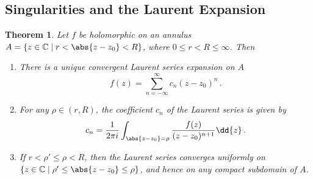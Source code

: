 \documentclass{article}
\theoremstyle{plain}\theoremheaderfont{\normalfont\itshape}\theorembodyfont{\rmfamily}\theoremseparator{.}\newtheorem*{rem}{Remark}\newtheorem*{ex}{Example}\newtheorem*{proof}{Proof}\newtheorem*{altp}{Alternative proof}
\theoremstyle{plain}\theoremheaderfont{\normalfont\bfseries}\theorembodyfont{\rmfamily}\theoremseparator{.}\newtheorem{thm}{Theorem}[section]\newtheorem{lem}[thm]{Lemma}\newtheorem{prop}[thm]{Proposition}\newtheorem*{cor}{Corollary}\newtheorem{defn}[thm]{Definition}\newtheorem{clm}[thm]{Claim}\newtheorem{clminproof}{Claim}
\theoremstyle{break}\theoremheaderfont{\normalfont\itshape}\theorembodyfont{\rmfamily}\theoremseparator{.\medskip}\newtheorem*{proofskip}{Proof}\newtheorem*{exs}{Examples}\newtheorem*{rems}{Remarks}
\theoremstyle{break}\theoremheaderfont{\normalfont\bfseries}\theorembodyfont{\rmfamily}\theoremseparator{.\medskip}\newtheorem{lemskip}[thm]{Lemma}\newtheorem{defnskip}[thm]{Definition}\newtheorem{propskip}[thm]{Proposition}\newtheorem{thmskip}[thm]{Theorem}
\numberwithin{equation}{section}
\begin{document}
	\subsection{Singularities and the Laurent Expansion}
	\begin{thm}
		Let \(f\) be holomorphic on an annulus \(A=\{z\in\mathbb{C}\mid r<\abs{z-z_0}<R\}\), where \(0\le r<R\le\infty\). Then
		\begin{enumerate}[topsep=0pt]
			\item There is a unique convergent \textit{Laurent series expansion} on \(A\)
			\[f(z)=\sum_{n=-\infty}^{\infty}c_n(z-z_0)^n\,.\]
			\item For any \(\rho\in(r,R)\), the coefficient \(c_n\) of the Laurent series is given by
			\[c_n=\frac{1}{2\pi i}\int_{\abs{z-z_0}=\rho}\frac{f(z)}{(z-z_0)^{n+1}}\dd{z}\,.\]
			\item If \(r<\rho'\le\rho<R\), then the Laurent series converges uniformly on \(\{z\in\mathbb{C}\mid \rho'\le\abs{z-z_0}\le\rho\}\), and hence on any compact subdomain of \(A\).
		\end{enumerate}
	\end{thm}
\end{document}
